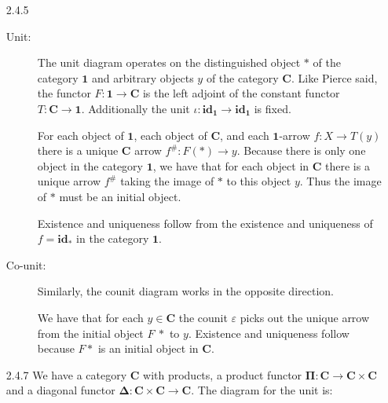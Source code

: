 \documentclass{article}
\newcommand{\one}{\mathbf{1}}
\newcommand{\ccat}{\mathbf{C}}
\newcommand{\id}{\mathbf{id}}
\newcommand{\pifun}{\mathbf{\Pi}}
\newcommand{\diagfun}{\mathbf{\Delta}}
\begin{document}
\begin{enumerate}
\item [2.4.5]
  \begin{description}
  \item [Unit:]
    The unit diagram operates on the distinguished object $*$ of the category $\one$ and arbitrary objects $y$ of the category $\ccat$.
    Like Pierce said, the functor $F : \one \rightarrow \ccat$ is the left adjoint of the constant functor $T : \ccat \rightarrow \one$.
    Additionally the unit $\iota : \id_\one \rightarrow \id_\one$ is fixed.
    \begin{center}
    \end{center}
    For each object of $\one$, each object of $\ccat$, and each $\one$-arrow $f: X \rightarrow T(y)$ there is a unique $\ccat$ arrow $f^{\#} : F(*) \rightarrow y$.
    Because there is only one object in the category $\one$, we have that for each object in $\ccat$ there is a unique arrow $f^{\#}$ taking the image of $*$ to this object $y$.
    Thus the image of $*$ must be an initial object.

    Existence and uniqueness follow from the existence and uniqueness of $f = \id_*$ in the category $\one$.

  \vfill{}
  \item [Co-unit:]
    Similarly, the counit diagram works in the opposite direction.
    \begin{center}
    \end{center}
    We have that for each $y \in \ccat$ the counit $\varepsilon$ picks out the unique arrow from the initial object $F~*$ to $y$.
    Existence and uniqueness follow because $F*$ is an initial object in $\ccat$.
  \end{description}
  \vfill{}
\newpage
\item[2.4.7]
  We have a category $\ccat$ with products, a product functor $\pifun : \ccat \rightarrow \ccat \times \ccat$ and a diagonal functor $\diagfun : \ccat \times \ccat \rightarrow \ccat$.
  The diagram for the unit is:
  \begin{center}
\end{center}
\end{enumerate}
\end{document}
